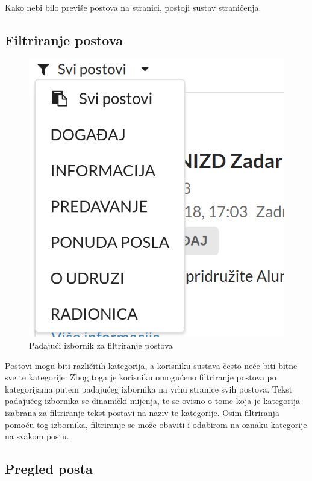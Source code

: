 \documentclass[zavrsni, numeric]{fer}
\begin{document}
Kako nebi bilo previše postova na stranici, postoji sustav straničenja.

\subsection{Filtriranje postova}

\begin{figure}[H]
	\centering
	\includegraphics[width=13cm]{slike/filter.png}
	\caption{Padajući izbornik za filtriranje postova}
	\label{fig:filter}
\end{figure}

Postovi mogu biti različitih kategorija, a korisniku sustava često neće biti bitne sve te kategorije. Zbog toga je korisniku omogućeno filtriranje postova po kategorijama putem padajućeg izbornika na vrhu stranice svih postova. Tekst padajućeg izbornika se dinamički mijenja, te se ovisno o tome koja je kategorija izabrana za filtriranje tekst postavi na naziv te kategorije. Osim filtriranja pomoću tog izbornika, filtriranje se može obaviti i odabirom na oznaku kategorije na svakom postu.

\subsection{Pregled posta}
\end{document}
